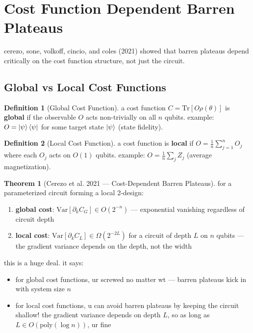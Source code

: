 \documentclass[11pt,a4paper]{article}
\theoremstyle{definition}
\newtheorem{definition}{Definition}[section]
\newtheorem{theorem}{Theorem}[section]
\theoremstyle{remark}
\begin{document}
\section{Cost Function Dependent Barren Plateaus}

cerezo, sone, volkoff, cincio, and coles (2021) showed that barren plateaus depend critically on the cost function structure, not just the circuit.

\subsection{Global vs Local Cost Functions}

\begin{definition}[Global Cost Function]
a cost function $C = \text{Tr}[O \rho(\theta)]$ is \textbf{global} if the observable $O$ acts non-trivially on all $n$ qubits. example: $O = \ket{\psi}\bra{\psi}$ for some target state $\ket{\psi}$ (state fidelity).
\end{definition}

\begin{definition}[Local Cost Function]
a cost function is \textbf{local} if $O = \frac{1}{n}\sum_{j=1}^{n} O_j$ where each $O_j$ acts on $O(1)$ qubits. example: $O = \frac{1}{n}\sum_j Z_j$ (average magnetization).
\end{definition}

\begin{theorem}[Cerezo et al. 2021 --- Cost-Dependent Barren Plateaus]
for a parameterized circuit forming a local 2-design:
\begin{enumerate}[label=(\roman*)]
    \item \textbf{global cost}: $\text{Var}[\partial_k C_G] \in O(2^{-n})$ --- exponential vanishing regardless of circuit depth
    \item \textbf{local cost}: $\text{Var}[\partial_k C_L] \in \Omega(2^{-2L})$ for a circuit of depth $L$ on $n$ qubits --- the gradient variance depends on the depth, not the width
\end{enumerate}
\end{theorem}

this is a huge deal. it says:

\begin{itemize}
    \item for global cost functions, ur screwed no matter wt --- barren plateaus kick in with system size $n$
    \item for local cost functions, u can avoid barren plateaus by keeping the circuit shallow! the gradient variance depends on depth $L$, so as long as $L \in O(\text{poly}(\log n))$, ur fine
\end{itemize}
\end{document}
